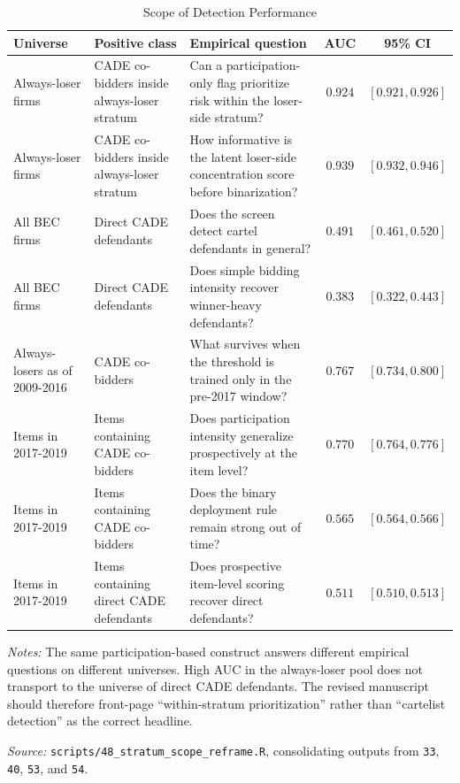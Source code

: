 \begin{table}[htbp]
\centering
\caption{Scope of Detection Performance}
\label{tab:stratum_scope}
\begin{threeparttable}
\small
\begin{tabular}{p{2.7cm}p{3.1cm}p{5.6cm}cc}
\toprule
Universe & Positive class & Empirical question & AUC & 95\% CI \\
\midrule
Always-loser firms & CADE co-bidders inside always-loser stratum & Can a participation-only flag prioritize risk within the loser-side stratum? & $0.924$ & $[0.921, 0.926]$ \\
Always-loser firms & CADE co-bidders inside always-loser stratum & How informative is the latent loser-side concentration score before binarization? & $0.939$ & $[0.932, 0.946]$ \\
All BEC firms & Direct CADE defendants & Does the screen detect cartel defendants in general? & $0.491$ & $[0.461, 0.520]$ \\
All BEC firms & Direct CADE defendants & Does simple bidding intensity recover winner-heavy defendants? & $0.383$ & $[0.322, 0.443]$ \\
Always-losers as of 2009-2016 & CADE co-bidders & What survives when the threshold is trained only in the pre-2017 window? & $0.767$ & $[0.734, 0.800]$ \\
Items in 2017-2019 & Items containing CADE co-bidders & Does participation intensity generalize prospectively at the item level? & $0.770$ & $[0.764, 0.776]$ \\
Items in 2017-2019 & Items containing CADE co-bidders & Does the binary deployment rule remain strong out of time? & $0.565$ & $[0.564, 0.566]$ \\
Items in 2017-2019 & Items containing direct CADE defendants & Does prospective item-level scoring recover direct defendants? & $0.511$ & $[0.510, 0.513]$ \\
\bottomrule
\end{tabular}
\begin{tablenotes}
\small
\item \textit{Notes:} The same participation-based construct answers different empirical questions on different universes. High AUC in the always-loser pool does not transport to the universe of direct CADE defendants. The revised manuscript should therefore front-page ``within-stratum prioritization'' rather than ``cartelist detection'' as the correct headline.
\item \textit{Source:} \texttt{scripts/48\_stratum\_scope\_reframe.R}, consolidating outputs from \texttt{33}, \texttt{40}, \texttt{53}, and \texttt{54}.
\end{tablenotes}
\end{threeparttable}
\end{table}
